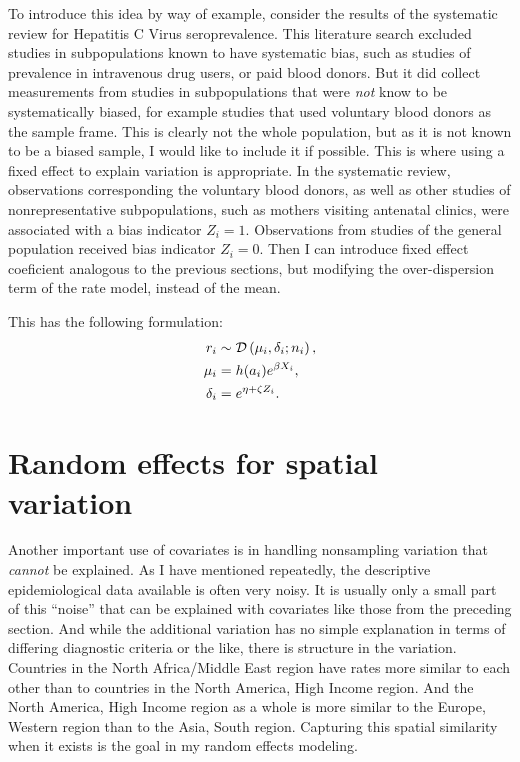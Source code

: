To introduce this idea by way of example, consider the results of the
systematic review for Hepatitis C Virus seroprevalence.  This
literature search excluded studies in subpopulations known to have
systematic bias, such as studies of prevalence in intravenous drug
users, or paid blood donors.  But it did collect measurements from
studies in subpopulations that were \emph{not} know to be
systematically biased, for example studies that used voluntary blood
donors as the sample frame.  This is clearly not the whole population,
but as it is not known to be a biased sample, I would like to include
it if possible.  This is where using a fixed effect to explain
variation is appropriate. In the systematic review, observations corresponding
the voluntary blood donors, as well as other studies of nonrepresentative
subpopulations, such as mothers visiting antenatal clinics, were
associated with a
bias indicator $Z_i = 1$.  Observations from studies of the general
population received bias indicator $Z_i = 0$.  Then I can 
introduce fixed effect coeficient analogous to the previous sections,
but modifying the over-dispersion term of the rate model, instead of
the mean.

This has the following
formulation:
\begin{align*}
r_i &\sim \mathcal{D}\left(\mu_i, \delta_i; n_i\right),\\
\mu_i &= h(a_i)e^{\beta X_i},\\
\delta_i &= e^{\eta + \zeta Z_i}.
\end{align*}

\section{Random effects for spatial variation}
Another important use of covariates is in handling nonsampling
variation that \emph{cannot} be explained. As I have mentioned
repeatedly, the descriptive epidemiological data available is often
very noisy.  It is usually only a small part of this ``noise'' that
can be explained with covariates like those from the preceding
section. And while the additional variation has no simple explanation
in terms of differing diagnostic criteria or the like, there is
structure in the variation. Countries in the North Africa/Middle East
region have rates more similar to each other than to countries in the
North America, High Income region.  And the North America, High Income
region as a whole is more similar to the Europe, Western region than
to the Asia, South region.  Capturing this spatial similarity when it
exists is the goal in my random effects modeling.

